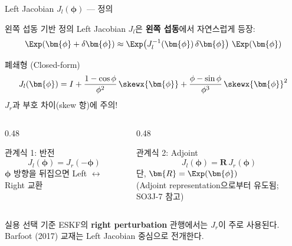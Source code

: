 \begin{frame}[shrink=20]{Left Jacobian $J_l(\bm{\phi})$ --- 정의}
  \begin{block}{왼쪽 섭동 기반 정의}
    Left Jacobian $J_l$은 \textbf{왼쪽 섭동}에서 자연스럽게 등장:
    \[
      \Exp(\bm{\phi}+\delta\bm{\phi}) \approx \Exp\!\left(J_l^{-1}(\bm{\phi})\,\delta\bm{\phi}\right)\,\Exp(\bm{\phi})
    \]
  \end{block}
  \pause
  \begin{block}{폐쇄형 (Closed-form)}
    \[
      J_l(\bm{\phi}) = I
        + \frac{1 - \cos\phi}{\phi^2}\,\skewx{\bm{\phi}}
        + \frac{\phi - \sin\phi}{\phi^3}\,\skewx{\bm{\phi}}^2
    \]
    $J_r$과 부호 차이(skew 항)에 주의!
  \end{block}
  \pause
  \begin{columns}[T]
    \begin{column}{0.48\textwidth}
      \begin{alertblock}{관계식 1: 반전}
        \[
          J_l(\bm{\phi}) = J_r(-\bm{\phi})
        \]
        $\bm{\phi}$ 방향을 뒤집으면 Left $\leftrightarrow$ Right 교환
      \end{alertblock}
    \end{column}
    \begin{column}{0.48\textwidth}
      \begin{alertblock}{관계식 2: Adjoint}
        \[
          J_l(\bm{\phi}) = \bm{R}\,J_r(\bm{\phi})
        \]
        단, $\bm{R} = \Exp(\bm{\phi})$\\
        \medskip
        (Adjoint representation으로부터 유도됨; SO3J-7 참고)
      \end{alertblock}
    \end{column}
  \end{columns}
  \vspace{0.4em}
  \begin{exampleblock}{실용 선택 기준}
    ESKF의 \textbf{right perturbation} 관행에서는 $J_r$이 주로 사용된다.\\
    Barfoot (2017) 교재는 Left Jacobian 중심으로 전개한다.
  \end{exampleblock}
\end{frame}


